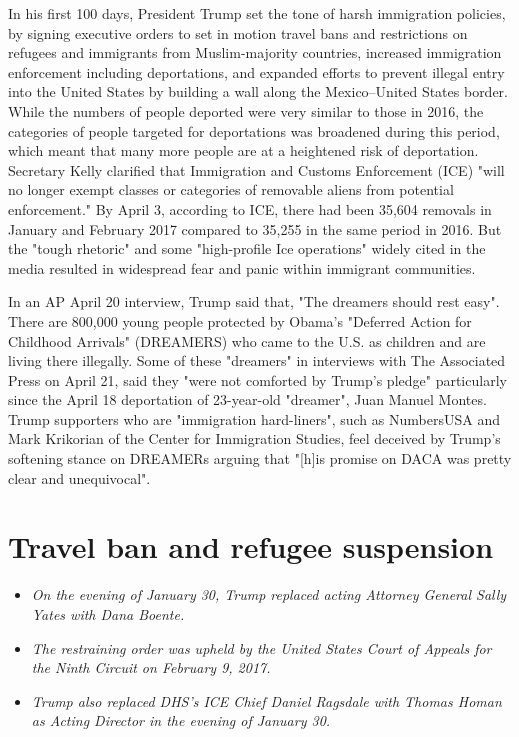 In his first 100 days, President Trump set the tone of harsh immigration
policies, by signing executive orders to set in motion travel bans and
restrictions on refugees and immigrants from Muslim-majority countries,
increased immigration enforcement including deportations, and expanded
efforts to prevent illegal entry into the United States by building a
wall along the Mexico--United States border. While the numbers of people
deported were very similar to those in 2016, the categories of people
targeted for deportations was broadened during this period, which meant
that many more people are at a heightened risk of deportation. Secretary
Kelly clarified that Immigration and Customs Enforcement (ICE) "will no
longer exempt classes or categories of removable aliens from potential
enforcement." By April 3, according to ICE, there had been 35,604
removals in January and February 2017 compared to 35,255 in the same
period in 2016. But the "tough rhetoric" and some "high-profile Ice
operations" widely cited in the media resulted in widespread fear and
panic within immigrant communities.

In an AP April 20 interview, Trump said that, "The dreamers should rest
easy". There are 800,000 young people protected by Obama's "Deferred
Action for Childhood Arrivals" (DREAMERS) who came to the U.S. as
children and are living there illegally. Some of these "dreamers" in
interviews with The Associated Press on April 21, said they "were not
comforted by Trump's pledge" particularly since the April 18 deportation
of 23-year-old "dreamer", Juan Manuel Montes. Trump supporters who are
"immigration hard-liners", such as NumbersUSA and Mark Krikorian of the
Center for Immigration Studies, feel deceived by Trump's softening
stance on DREAMERs arguing that "{[}h{]}is promise on DACA was pretty
clear and unequivocal".

\section{Travel ban and refugee
suspension}\label{travel-ban-and-refugee-suspension}

\begin{itemize}
\item
  \emph{On the evening of January 30, Trump replaced acting Attorney
  General Sally Yates with Dana Boente.}
\item
  \emph{The restraining order was upheld by the United States Court of
  Appeals for the Ninth Circuit on February 9, 2017.}
\item
  \emph{Trump also replaced DHS's ICE Chief Daniel Ragsdale with Thomas
  Homan as Acting Director in the evening of January 30.}
\end{itemize}

